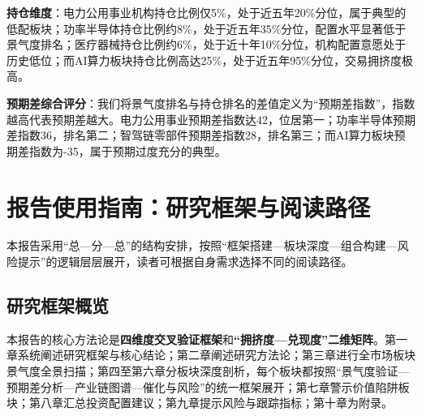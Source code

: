 \textbf{持仓维度}：电力公用事业机构持仓比例仅5\%，处于近五年20\%分位，属于典型的低配板块；功率半导体持仓比例约8\%，处于近五年35\%分位，配置水平显著低于景气度排名；医疗器械持仓比例约6\%，处于近十年10\%分位，机构配置意愿处于历史低位；而AI算力板块持仓比例高达25\%，处于近五年95\%分位，交易拥挤度极高。

\textbf{预期差综合评分}：我们将景气度排名与持仓排名的差值定义为“预期差指数”，指数越高代表预期差越大。电力公用事业预期差指数达42，位居第一；功率半导体预期差指数36，排名第二；智驾链零部件预期差指数28，排名第三；而AI算力板块预期差指数为-35，属于预期过度充分的典型。

\section{报告使用指南：研究框架与阅读路径}

本报告采用“总—分—总”的结构安排，按照“框架搭建—板块深度—组合构建—风险提示”的逻辑层层展开，读者可根据自身需求选择不同的阅读路径。

\subsection{研究框架概览}

本报告的核心方法论是\textbf{四维度交叉验证框架}和\textbf{“拥挤度—兑现度”二维矩阵}。第一章系统阐述研究框架与核心结论；第二章阐述研究方法论；第三章进行全市场板块景气度全景扫描；第四至第六章分板块深度剖析，每个板块都按照“景气度验证—预期差分析—产业链图谱—催化与风险”的统一框架展开；第七章警示价值陷阱板块；第八章汇总投资配置建议；第九章提示风险与跟踪指标；第十章为附录。

